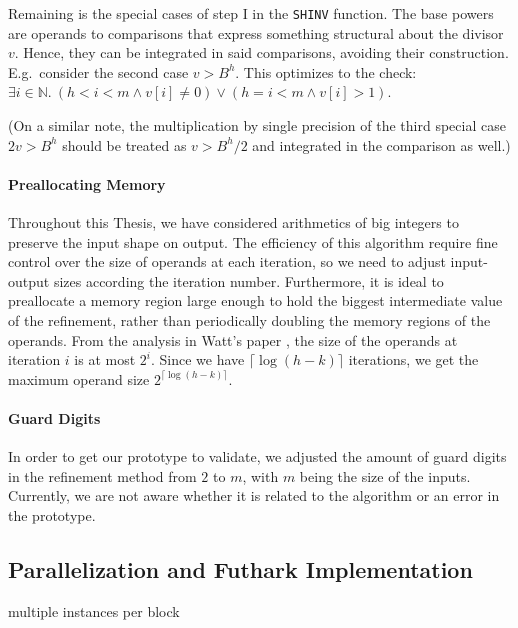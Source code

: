 Remaining is the special cases of step I in the \texttt{SHINV} function. The
base powers are operands to comparisons that express something structural about
the divisor $v$. Hence, they can be integrated in said comparisons, avoiding
their construction.  E.g.\ consider the second case $v > B^h$. This optimizes to
the check: $\exists i\in \mathbb{N}.~(h<i<m \land v[i] \neq 0) \lor (h = i<m \land v[i] > 1)$.

(On a similar note, the multiplication by single precision of the third special
case $2v > B^h$ should be treated as $v > B^h/2$ and integrated in the
comparison as well.)

\paragraph{Preallocating Memory}
Throughout this Thesis, we have considered arithmetics of big integers to preserve
the input shape on output. The efficiency of this algorithm require fine control
over the size of operands at each iteration, so we need to adjust input-output
sizes according the iteration number. Furthermore, it is ideal to
preallocate a memory region large enough to hold the biggest intermediate value
of the refinement, rather than periodically doubling the memory regions of the
operands. From the analysis in Watt's paper \cite{watt2023efficient}, the size
of the operands at iteration $i$ is at most $2^i$. Since we have
$\lceil \log (h-k) \rceil$ iterations, we get the maximum operand size
$2^{\lceil \log (h-k) \rceil}$.


\paragraph{Guard Digits}
In order to get our prototype to validate, we adjusted the amount of guard
digits in the refinement method from $2$ to $m$, with $m$ being the size of the
inputs. Currently, we are not aware whether it is related to the algorithm or an
error in the prototype.

\subsection{Parallelization and Futhark Implementation}
\label{subsec:divfut}

{\red [Missing]}

multiple instances per block


